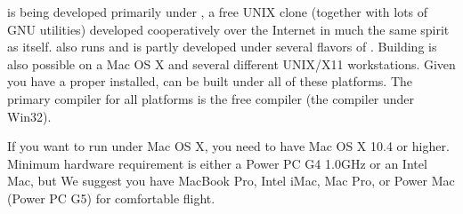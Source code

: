 {\FlightGear{} is being developed primarily under , a free UNIX clone
(together with lots of GNU utilities) developed cooperatively over the Internet in much
the same spirit as \FlightGear{} itself. \FlightGear{} also runs and is partly developed
under several flavors of . Building \FlightGear{} is also possible on a Mac OS X
and several different UNIX/X11 workstations. Given you have a proper  installed,
\FlightGear{} can be built under all of these platforms. The primary compiler for all platforms is
the free  compiler (the   compiler under Win32).

If you want to run \FlightGear under Mac OS X, you need to have Mac OS X 10.4 or higher.
Minimum hardware requirement is either a Power PC G4 1.0GHz or an Intel Mac, but We suggest
you have MacBook Pro, Intel iMac, Mac Pro, or Power Mac (Power PC G5) for comfortable flight.
}{}

